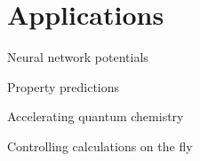 \section{Applications}
\begin{frame}[t]{Neural network potentials}

\end{frame}
\begin{frame}[t]{Property predictions}

\end{frame}
\begin{frame}[t]{Accelerating quantum chemistry}

\end{frame}
\begin{frame}[t]{Controlling calculations on the fly}

\end{frame}
